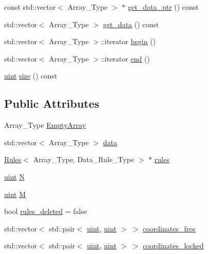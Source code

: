 \textbf{ }\par
\begin{DoxyCompactItemize}
\item 
const std\+::vector$<$ Array\+\_\+\+Type $>$ $\ast$ \hyperlink{class_power_set_a99cf1aa56e63a16c023bf7057b0b9288}{get\+\_\+data\+\_\+ptr} () const
\item 
std\+::vector$<$ Array\+\_\+\+Type $>$ \hyperlink{class_power_set_a4de44631d9a7967db4dd791d42166115}{get\+\_\+data} () const
\item 
std\+::vector$<$ Array\+\_\+\+Type $>$\+::iterator \hyperlink{class_power_set_abed9d58db924366d8a38baf168131fc3}{begin} ()
\item 
std\+::vector$<$ Array\+\_\+\+Type $>$\+::iterator \hyperlink{class_power_set_ac734ed684aa314b722a05d423c607a38}{end} ()
\item 
\hyperlink{typedefs_8hpp_a91ad9478d81a7aaf2593e8d9c3d06a14}{uint} \hyperlink{class_power_set_a80e7099e115369326e6c873a92d270f9}{size} () const
\end{DoxyCompactItemize}

\subsection*{Public Attributes}
\begin{DoxyCompactItemize}
\item 
Array\+\_\+\+Type \hyperlink{class_power_set_a367db2c97e0301dd0dd78e5e4b458d34}{Empty\+Array}
\item 
std\+::vector$<$ Array\+\_\+\+Type $>$ \hyperlink{class_power_set_af456c157d157692ba5890c549c51af75}{data}
\item 
\hyperlink{class_rules}{Rules}$<$ Array\+\_\+\+Type, Data\+\_\+\+Rule\+\_\+\+Type $>$ $\ast$ \hyperlink{class_power_set_afa542ecc31858c8644d1e76078eb1713}{rules}
\item 
\hyperlink{typedefs_8hpp_a91ad9478d81a7aaf2593e8d9c3d06a14}{uint} \hyperlink{class_power_set_ab3b65c1b9bce012f4aabe5acae093acd}{N}
\item 
\hyperlink{typedefs_8hpp_a91ad9478d81a7aaf2593e8d9c3d06a14}{uint} \hyperlink{class_power_set_a91d328d5ace1ed6a8587a66af905ae98}{M}
\item 
bool \hyperlink{class_power_set_a08b6baf1e244e023d997ddaecbc2116f}{rules\+\_\+deleted} = false
\item 
std\+::vector$<$ std\+::pair$<$ \hyperlink{typedefs_8hpp_a91ad9478d81a7aaf2593e8d9c3d06a14}{uint}, \hyperlink{typedefs_8hpp_a91ad9478d81a7aaf2593e8d9c3d06a14}{uint} $>$ $>$ \hyperlink{class_power_set_a99cfef97c3a457ea7be1b000b39f41d9}{coordinates\+\_\+free}
\item 
std\+::vector$<$ std\+::pair$<$ \hyperlink{typedefs_8hpp_a91ad9478d81a7aaf2593e8d9c3d06a14}{uint}, \hyperlink{typedefs_8hpp_a91ad9478d81a7aaf2593e8d9c3d06a14}{uint} $>$ $>$ \hyperlink{class_power_set_ac5cdec06502e8bd20e36fca3abbb9a3e}{coordinates\+\_\+locked}
\end{DoxyCompactItemize}



